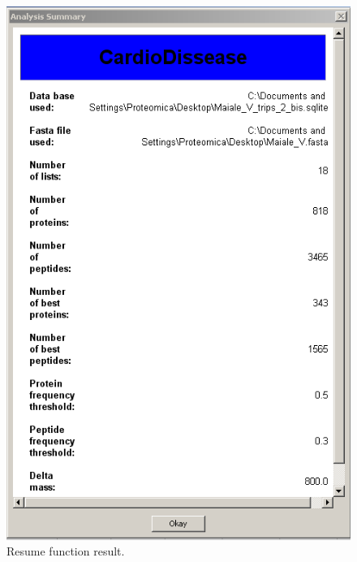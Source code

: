 \documentclass[a4paper,14pt]{extarticle}
\begin{document}
\begin{figure}[htbp]
\begin{center}
\includegraphics[scale=0.3]{Eppi_20}
\caption{Resume function result.}\label{fig:report}
\end{center}
\end{figure}
\end{document}
